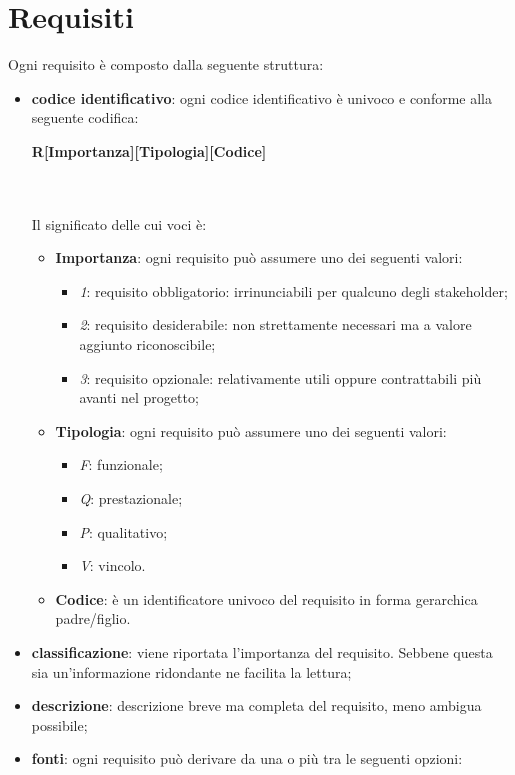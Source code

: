 
\section{Requisiti} 
Ogni requisito è composto dalla seguente struttura:
\begin{itemize}
	\item \textbf{codice identificativo}: ogni codice identificativo è univoco e conforme alla seguente codifica: \\
	\centerline{\textbf{R[Importanza][Tipologia][Codice]}} \\ \\
	Il significato delle cui voci è:
	\begin{itemize}
		\item \textbf{Importanza}: ogni requisito può assumere uno dei seguenti valori:
		\begin{itemize}
			\item \textit{1}: requisito obbligatorio: irrinunciabili per qualcuno degli stakeholder;
			\item \textit{2}: requisito desiderabile: non strettamente necessari ma  a valore aggiunto riconoscibile;
			\item \textit{3}: requisito opzionale: relativamente utili oppure contrattabili più avanti nel progetto;	
		\end{itemize}
		\item \textbf{Tipologia}: ogni requisito può assumere uno dei seguenti valori:
		\begin{itemize}
			\item \textit{F}: funzionale;
			\item \textit{Q}: prestazionale;
			\item \textit{P}: qualitativo;
			\item \textit{V}: vincolo.
		\end{itemize}
		\item \textbf{Codice}: è un identificatore univoco del requisito in forma gerarchica padre/figlio.
	\end{itemize}
	\item \textbf{classificazione}: viene riportata l'importanza del requisito. Sebbene questa sia un'informazione ridondante ne facilita la lettura;
	\item \textbf{descrizione}: descrizione breve ma completa del requisito, meno ambigua possibile;
	\item \textbf{fonti}: ogni requisito può derivare da una o più tra le seguenti opzioni:
	\begin{itemize}

\end{itemize}
\end{itemize}
